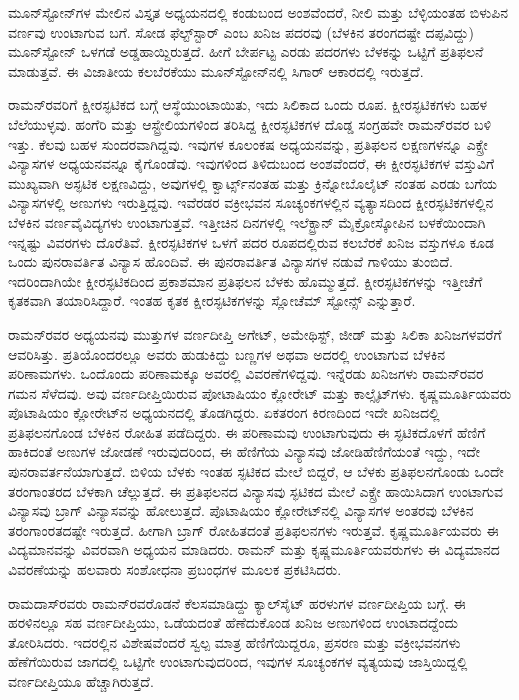 ಮೂನ್‍ಸ್ಟೋನ್‍ಗಳ ಮೇಲಿನ ವಿಸ್ತೃತ ಅಧ್ಯಯನದಲ್ಲಿ ಕಂಡುಬಂದ ಅಂಶವೆಂದರೆ, ನೀಲಿ ಮತ್ತು ಬೆಳ್ಳಿಯಂತಹ ಬಿಳುಪಿನ ವರ್ಣವು ಉಂಟಾಗುವ ಬಗೆ. ಸೋಡ ಫೆಲ್ಟ್‌ಸ್ಟಾರ್ ಎಂಬ ಖನಿಜ ಪದರವು (ಬೆಳಕಿನ ತರಂಗದಷ್ಟೇ ದಪ್ಪವಿದ್ದು) ಮೂನ್‍ಸ್ಟೋನ್ ಒಳಗಡೆ ಅಡ್ಡಹಾಯ್ದಿರುತ್ತದೆ. ಹೀಗೆ ಬೇರ್ಪಟ್ಟ ಎರಡು ಪದರಗಳು ಬೆಳಕನ್ನು ಒಟ್ಟಿಗೆ ಪ್ರತಿಫಲನೆ ಮಾಡುತ್ತವೆ. ಈ ವಿಜಾತೀಯ ಕಲಬೆರಕೆಯು ಮೂನ್‍ಸ್ಟೋನ್‍ನಲ್ಲಿ ಸಿಗಾರ್ ಆಕಾರದಲ್ಲಿ ಇರುತ್ತದೆ.

ರಾಮನ್‍ರವರಿಗೆ ಕ್ಷೀರಸ್ಫಟಿಕದ ಬಗ್ಗೆ ಆಸ್ಥೆಯುಂಟಾಯಿತು, ಇದು ಸಿಲಿಕಾದ ಒಂದು ರೂಪ. ಕ್ಷೀರಸ್ಫಟಿಕಗಳು ಬಹಳ ಬೆಲೆಯುಳ್ಳವು. ಹಂಗೆರಿ ಮತ್ತು ಆಸ್ಟ್ರೇಲಿಯಗಳಿಂದ ತರಿಸಿದ್ದ ಕ್ಷೀರಸ್ಫಟಿಕಗಳ ದೊಡ್ಡ ಸಂಗ್ರಹವೇ ರಾಮನ್‍ರವರ ಬಳಿ ಇತ್ತು. ಕೆಲವು ಬಹಳ ಸುಂದರವಾಗಿದ್ದವು. ಇವುಗಳ ಕೂಲಂಕಷ ಅಧ್ಯಯನವನ್ನು, ಪ್ರತಿಫಲನ ಲಕ್ಷಣಗಳನ್ನೂ ಎಕ್ಸ್\enginline{-}ರೇ ವಿನ್ಯಾಸಗಳ ಅಧ್ಯಯನವನ್ನೂ ಕೈಗೊಂಡೆವು. ಇವುಗಳಿಂದ ತಿಳಿದುಬಂದ ಅಂಶವೆಂದರೆ, ಈ ಕ್ಷೀರಸ್ಫಟಿಕಗಳ ವಸ್ತುವಿಗೆ ಮುಖ್ಯವಾಗಿ ಅಸ್ಫಟಿಕ ಲಕ್ಷಣವಿದ್ದು, ಅವುಗಳಲ್ಲಿ ಕ್ವಾರ್ಟ್ಸ್‌ನಂತಹ ಮತ್ತು ಕ್ರಿನ್ನೋಬೊಲೈಟ್ ನಂತಹ ಎರಡು ಬಗೆಯ ವಿನ್ಯಾಸಗಳಲ್ಲಿ ಅಣುಗಳು ಇರುತ್ತಿದ್ದವು. ಇವೆರಡರ ವಕ್ರೀಭವನ ಸೂಚ್ಯಂಕಗಳಲ್ಲಿನ ವ್ಯತ್ಯಾಸದಿಂದ ಕ್ಷೀರಸ್ಫಟಿಕಗಳಲ್ಲಿನ ಬೆಳಕಿನ ವರ್ಣವೈವಿದ್ಯಗಳು ಉಂಟಾಗುತ್ತವೆ. ಇತ್ತೀಚಿನ ದಿನಗಳಲ್ಲಿ ಇಲೆಕ್ಟ್ರಾನ್ ಮೈಕ್ರೋಸ್ಕೋಪಿನ ಬಳಕೆಯಿಂದಾಗಿ ಇನ್ನಷ್ಟು ವಿವರಗಳು ದೊರೆತಿವೆ. ಕ್ಷೀರಸ್ಫಟಿಕಗಳ ಒಳಗೆ ಪದರ ರೂಪದಲ್ಲಿರುವ ಕಲಬೆರಕೆ ಖನಿಜ ವಸ್ತುಗಳೂ ಕೂಡ ಒಂದು ಪುನರಾವರ್ತಿತ ವಿನ್ಯಾಸ ಹೊಂದಿವೆ. ಈ ಪುನರಾವರ್ತಿತ ವಿನ್ಯಾಸಗಳ ನಡುವೆ ಗಾಳಿಯು ತುಂಬಿದೆ. ಇದರಿಂದಾಗಿಯೇ ಕ್ಷೀರಸ್ಫಟಿಕದಿಂದ ಪ್ರಕಾಶಮಾನ ಪ್ರತಿಫಲನ ಬೆಳಕು ಹೊಮ್ಮುತ್ತದೆ. ಕ್ಷೀರಸ್ಫಟಿಕಗಳನ್ನು ಇತ್ತೀಚೆಗೆ ಕೃತಕವಾಗಿ ತಯಾರಿಸಿದ್ದಾರೆ. ಇಂತಹ ಕೃತಕ ಕ್ಷೀರಸ್ಫಟಿಕಗಳನ್ನು ಸ್ಲೋಚೆಮ್ ಸ್ಟೋನ್ಸ್  ಎನ್ನುತ್ತಾರೆ.

ರಾಮನ್‍ರವರ ಅಧ್ಯಯನವು ಮುತ್ತುಗಳ ವರ್ಣದೀಪ್ತಿ ಅಗೇಟ್, ಅಮೇಥಿಸ್ಟ್, ಜೀಡ್ ಮತ್ತು ಸಿಲಿಕಾ ಖನಿಜಗಳವರೆಗೆ ಆವರಿಸಿತ್ತು. ಪ್ರತಿಯೊಂದರಲ್ಲೂ ಅವರು ಹುಡುಕಿದ್ದು ಬಣ್ಣಗಳ ಅಥವಾ ಅದರಲ್ಲಿ ಉಂಟಾಗುವ ಬೆಳಕಿನ ಪರಿಣಾಮಗಳು. ಒಂದೊಂದು ಪರಿಣಾಮಕ್ಕೂ ಅವರಲ್ಲಿ ವಿವರಣೆಗಳಿದ್ದವು. ಇನ್ನೆರಡು ಖನಿಜಗಳು ರಾಮನ್‍ರವರ ಗಮನ ಸೆಳೆದವು. ಅವು ವರ್ಣದೀಪ್ತಿಯಿರುವ ಪೋಟಾಷಿಯಂ ಕ್ಲೋರೇಟ್ ಮತ್ತು ಕಾಲ್ಸೈಟ್‍ಗಳು. ಕೃಷ್ಣಮೂರ್ತಿಯವರು ಪೊಟಾಷಿಯಂ ಕ್ಲೋರೇಟ್‍ನ ಅಧ್ಯಯನದಲ್ಲಿ ತೊಡಗಿದ್ದರು. ಏಕತರಂಗ ಕಿರಣದಿಂದ ಇದೇ ಖನಿಜದಲ್ಲಿ ಪ್ರತಿಫಲನಗೊಂಡ ಬೆಳಕಿನ ರೋಹಿತ ಪಡೆದಿದ್ದರು. ಈ ಪರಿಣಾಮವು ಉಂಟಾಗುವುದು ಈ ಸ್ಫಟಿಕದೊಳಗೆ ಹೆಣಿಗೆ ಹಾಕಿದಂತೆ ಅಣುಗಳ ಜೋಡಣೆ ಇರುವುದರಿಂದ, ಈ ಹೆಣಿಗೆಯ ವಿನ್ಯಾಸವು ಜೋಡಿಹೆಣಿಗೆಯಂತೆ ಇದ್ದು, ಇದೇ ಪುನರಾವರ್ತನೆಯಾಗುತ್ತದೆ. ಬಿಳಿಯ ಬೆಳಕು ಇಂತಹ ಸ್ಫಟಿಕದ ಮೇಲೆ ಬಿದ್ದರೆ, ಆ ಬೆಳಕು ಪ್ರತಿಫಲನಗೊಂಡು ಒಂದೇ ತರಂಗಾಂತರದ ಬೆಳಕಾಗಿ ಚೆಲ್ಲುತ್ತದೆ. ಈ ಪ್ರತಿಫಲನದ ವಿನ್ಯಾಸವು ಸ್ಫಟಿಕದ ಮೇಲೆ ಎಕ್ಸ್\enginline{-}ರೇ ಹಾಯಿಸಿದಾಗ ಉಂಟಾಗುವ ವಿನ್ಯಾಸವು ಬ್ರಾಗ್ ವಿನ್ಯಾಸವನ್ನು ಹೋಲುತ್ತದೆ. ಪೊಟಾಷಿಯಂ ಕ್ಲೋರೇಟ್‍ನಲ್ಲಿ ವಿನ್ಯಾಸಗಳ ಅಂತರವು ಬೆಳಕಿನ ತರಂಗಾಂರತದಷ್ಟೇ ಇರುತ್ತದೆ. ಹೀಗಾಗಿ ಬ್ರಾಗ್ ರೋಹಿತದಂತೆ ಪ್ರತಿಫಲನಗಳು ಇರುತ್ತವೆ. ಕೃಷ್ಣಮೂರ್ತಿಯವರು ಈ ವಿದ್ಯಮಾನವನ್ನು ವಿವರವಾಗಿ ಅಧ್ಯಯನ ಮಾಡಿದರು. ರಾಮನ್ ಮತ್ತು ಕೃಷ್ಣಮೂರ್ತಿಯವರುಗಳು ಈ ವಿದ್ಯಮಾನದ ವಿವರಣೆಯನ್ನು ಹಲವಾರು ಸಂಶೋಧನಾ ಪ್ರಬಂಧಗಳ ಮೂಲಕ ಪ್ರಕಟಿಸಿದರು.

ರಾಮದಾಸ್‍ರವರು ರಾಮನ್‍ರವರೊಡನೆ ಕೆಲಸಮಾಡಿದ್ದು ಕ್ಯಾಲ್‍ಸೈಟ್ ಹರಳುಗಳ ವರ್ಣದೀಪ್ತಿಯ ಬಗ್ಗೆ. ಈ ಹರಳಿನಲ್ಲೂ ಸಹ ವರ್ಣದೀಪ್ತಿಯು, ಒಡೆಯದಂತೆ ಹೆಣೆದುಕೊಂಡ ಖನಿಜ ಅಣುಗಳಿಂದ ಉಂಟಾದದ್ದೆಂದು ತೋರಿಸಿದರು. ಇದರಲ್ಲಿನ ವಿಶೇಷವೆಂದರೆ ಸ್ವಲ್ಪ ಮಾತ್ರ ಹೆಣಿಗೆಯಿದ್ದರೂ, ಪ್ರಸರಣ ಮತ್ತು ವಕ್ರೀಭವನಗಳು ಹೆಣೆಗೆಯಿರುವ ಜಾಗದಲ್ಲಿ ಒಟ್ಟಿಗೇ ಉಂಟಾಗುವುದರಿಂದ, ಇವುಗಳ ಸೂಚ್ಯಂಕಗಳ ವ್ಯತ್ಯಯವು ಜಾಸ್ತಿಯಿದ್ದಲ್ಲಿ ವರ್ಣದೀಪ್ತಿಯೂ ಹೆಚ್ಚಾಗಿರುತ್ತದೆ.

